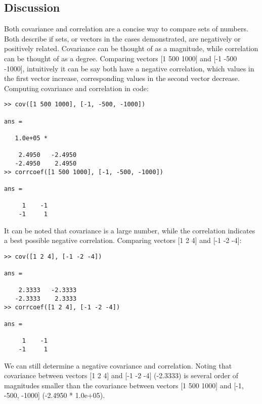\subsection{Discussion}
Both covariance and correlation are a concise way to compare sets of numbers. Both describe if sets, or vectors in the cases demonstrated, are negatively or positively related. Covariance can be thought of as a magnitude, while correlation can be thought of as a degree. Comparing vectors [1 500 1000] and [-1 -500 -1000], intuitively it can be say both have a negative correlation, which values in the first vector increase, corresponding values in the second vector decrease. Computing covariance and correlation in code:
\begin{verbatim}
>> cov([1 500 1000], [-1, -500, -1000])

ans =

   1.0e+05 *

    2.4950   -2.4950
   -2.4950    2.4950
>> corrcoef([1 500 1000], [-1, -500, -1000])

ans =

     1    -1
    -1     1  
\end{verbatim}
It can be noted that covariance is a large number, while the correlation indicates a best possible negative correlation. Comparing vectors [1 2 4] and [-1 -2 -4]:
\begin{verbatim}
>> cov([1 2 4], [-1 -2 -4])

ans =

    2.3333   -2.3333
   -2.3333    2.3333
>> corrcoef([1 2 4], [-1 -2 -4])

ans =

     1    -1
    -1     1   
\end{verbatim}
We can still determine a negative covariance and correlation. Noting that covariance between vectors [1 2 4] and [-1 -2 -4] (-2.3333) is several order of magnitudes smaller than the covariance between vectors [1 500 1000] and [-1, -500, -1000] (-2.4950 * 1.0e+05).
